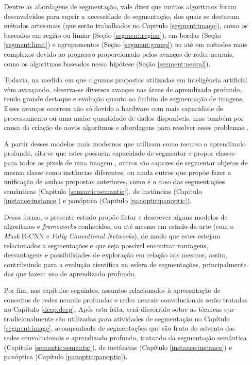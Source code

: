 Dentre as abordagens de segmentação, vale dizer que muitos algoritmos foram desenvolvidos para suprir a necessidade de segmentação, dos quais se destacam métodos artesanais (que serão trabalhados no Capitulo \ref{segment:image}), como os baseados em região ou limiar (Seção \ref{segment:region}), em bordas (Seção \ref{segment:limit}) e agrupamentos (Seção \ref{segment:group}) ou até em métodos mais complexos devido ao progresso proporcionado pelos avanços de redes neurais, como os algoritmos baseados nessa hipótese (Seção \ref{segment:neural}).

Todavia, na medida em que algumas propostas utilizadas em inteligência artificial vêm avançando, observa-se diversos avanços nas áreas de aprendizado profundo, tendo grande destaque e evolução quanto ao âmbito de segmentação de imagens. Esses avanços ocorrem não só devido a hardware com mais capacidade de processamento ou uma maior quantidade de dados disponíveis, mas também por causa da criação de novos algoritmos e abordagens para resolver esses problemas \cite{Szegedy2015}.

A partir desses modelos mais modernos que utilizam como recurso o aprendizado profundo, cita-se que estes possuem capacidade de segmentar e propor classes para todos os pixels de uma imagem \cite{Minaee2021}, outros são capazes de segmentar objetos de mesma classe como instâncias diferentes, ou ainda outros que propõe fazer a unificação de ambas propostas anteriores, como é o caso das segmentações semânticas (Capitulo \ref{semantic:semantic}), de instâncias (Capitulo \ref{instance:instance}) e panóptica (Capitulo \ref{panoptic:panoptic}).

Dessa forma, o presente estudo propõe listar e descrever alguns modelos de algoritmos e \textit{frameworks} conhecidos, ou até mesmo em estado-da-arte (com o \textit{Mask} R-CNN e \textit{Fully Convutional Networks}), de modo que estes estejam relacionados a segmentações e que seja possível encontrar vantagens, desvantagens e possibilidades de exploração em relação aos mesmos, assim, contribuindo para a evolução científica na esfera de segmentações, principalmente das que fazem uso de aprendizado profundo.

Por fim, nos capítulos seguintes, assuntos relacionados à apresentação de conceitos de redes neurais profundas e redes neurais convolucionais serão tratadas no Capitulo \ref{deep:deep}. Após esta feita, será discorrido sobre as técnicas que tradicionalmente são utilizadas para atividades de segmentação no Capítulo \ref{segment:image}, acompanhada de segmentações que são fruto do advento das redes convolucionais e aprendizado profundo, tratando da segmentação semântica (Capítulo \ref{semantic:semantic}), de instâncias (Capítulo \ref{instance:instance}) e panóptica (Capítulo \ref{panoptic:panoptic}).